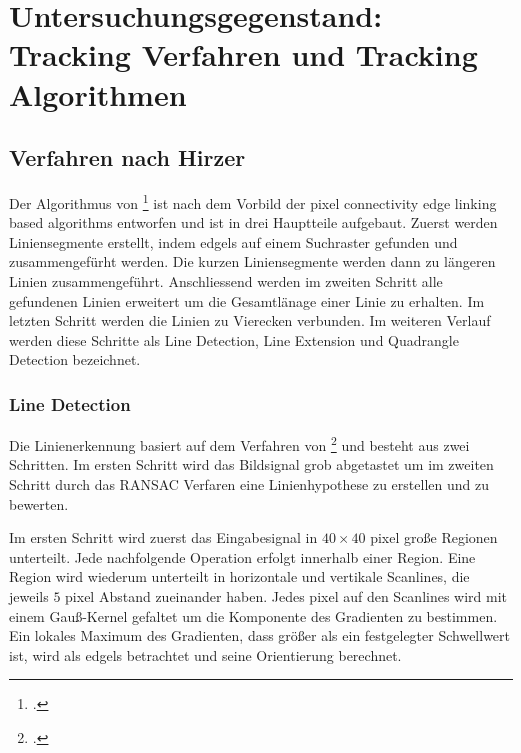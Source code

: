 \section{Untersuchungsgegenstand: Tracking Verfahren und Tracking Algorithmen} %
\label{sec:untersuchungsgegenstand}
\begin{comment}
	Untersuchungsgegenstand: Verfahren und Algorithmen präzise vorstellen und ihre Unterschiede hervorheben.
	Notwendige Kriterien der Algorithmen bestimmen

	Grober Ablauf der Verfahren:
	* Wer hats erfunden?
	* Wie ist das Verfahren aufgebaut (Algo in grob)
	* Welche Kriterien müssen erfüllt sein (monochrome, rgb eingabe)?
\end{comment}

\subsection{Verfahren nach Hirzer} %
\label{sub:verfahren_nach_hirzer}

Der Algorithmus von \citeauthor{hirzer08}\footcite{hirzer08} ist nach dem Vorbild der pixel connectivity edge linking based algorithms entworfen und ist in drei Hauptteile aufgebaut. Zuerst werden Liniensegmente erstellt, indem \gls{edgels} auf einem Suchraster gefunden und zusammengefürht werden. Die kurzen Liniensegmente werden dann zu längeren Linien zusammengeführt. Anschliessend werden im zweiten Schritt alle gefundenen Linien erweitert um die Gesamtlänage einer Linie zu erhalten. Im letzten Schritt werden die Linien zu Vierecken verbunden. Im weiteren Verlauf werden diese Schritte als Line Detection, Line Extension und Quadrangle Detection bezeichnet.

\subsubsection{Line Detection} %
\label{sub:line_detection}
Die Linienerkennung basiert auf dem Verfahren von \citeauthor{clarke96}\footcite{clarke96} und besteht aus zwei Schritten. Im ersten Schritt wird das Bildsignal grob abgetastet um im zweiten Schritt durch das RANSAC Verfaren eine Linienhypothese zu erstellen und zu bewerten.



Im ersten Schritt wird zuerst das Eingabesignal in $40 \times 40$ \gls{pixel} große Regionen unterteilt. Jede nachfolgende Operation erfolgt innerhalb einer Region. Eine Region wird wiederum unterteilt in horizontale und vertikale Scanlines, die jeweils $5$ \gls{pixel} Abstand zueinander haben. Jedes \gls{pixel} auf den Scanlines wird mit einem Gauß-Kernel gefaltet um die Komponente des Gradienten zu bestimmen. Ein lokales Maximum des Gradienten, dass größer als ein festgelegter Schwellwert ist, wird als \gls{edgels} betrachtet und seine Orientierung berechnet.

